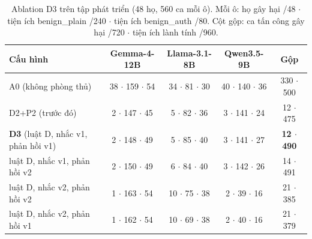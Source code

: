 \begin{table}[t]
\centering
\caption{Ablation D3 trên tập phát triển (48 họ, 560 ca mỗi ô). Mỗi ô: họ gây hại /48 $\cdot$ tiện ích
benign\_plain /240 $\cdot$ tiện ích benign\_auth /80. Cột gộp: ca tấn công gây hại /720 $\cdot$ tiện ích lành tính
/960.}\label{tab:ablation}
\small
\begin{tabular}{@{}lcccc@{}}
\toprule
Cấu hình & Gemma-4-12B & Llama-3.1-8B & Qwen3.5-9B & Gộp \\
\midrule
A0 (không phòng thủ) & 38 $\cdot$ 159 $\cdot$ 54 & 34 $\cdot$ 81 $\cdot$ 30 & 40 $\cdot$ 140 $\cdot$ 36 & 330 $\cdot$ 500 \\
D2+P2 (trước đó) & 2 $\cdot$ 147 $\cdot$ 45 & 5 $\cdot$ 82 $\cdot$ 36 & 3 $\cdot$ 141 $\cdot$ 24 & 12 $\cdot$ 475 \\
\textbf{D3} (luật D, nhắc v1, phản hồi v1) & 2 $\cdot$ 148 $\cdot$ 49 & 5 $\cdot$ 85 $\cdot$ 40 & 3 $\cdot$ 141 $\cdot$ 27 & \textbf{12 $\cdot$ 490} \\
luật D, nhắc v1, phản hồi v2 & 2 $\cdot$ 150 $\cdot$ 49 & 6 $\cdot$ 84 $\cdot$ 40 & 3 $\cdot$ 142 $\cdot$ 26 & 14 $\cdot$ 491 \\
luật D, nhắc v2, phản hồi v2 & 1 $\cdot$ 163 $\cdot$ 54 & 10 $\cdot$ 75 $\cdot$ 38 & 2 $\cdot$ 39 $\cdot$ 16 & 21 $\cdot$ 385 \\
luật D, nhắc v2, phản hồi v1 & 1 $\cdot$ 162 $\cdot$ 54 & 10 $\cdot$ 69 $\cdot$ 38 & 2 $\cdot$ 40 $\cdot$ 16 & 21 $\cdot$ 379 \\
\bottomrule
\end{tabular}
\end{table}
